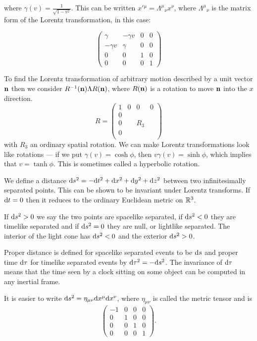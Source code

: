 \documentclass{notes}
\begin{document}
where $\gamma(v) = \frac{1}{\sqrt{1-v^2}}$.  This can be written
$x'{}^\mu = \Lambda^\mu{}_\nu x^\nu$, where $\Lambda^\mu{}_\nu$ is the
matrix form of the Lorentz transformation, in this case:

\[
\begin{pmatrix}
\gamma & - \gamma v & 0 & 0 \\
- \gamma v & \gamma & 0 & 0 \\
0 & 0 & 1 & 0 \\
0 & 0 & 0 & 1
\end{pmatrix}
\]

To find the Lorentz transformation of arbitrary motion described by
a unit vector $\mathbf{n}$ then we consider
$R^{-1}(\mathbf{n}) \Lambda R(\mathbf{n})$, where $R(\mathbf{n})$ is a rotation
to move $\mathbf{n}$ into the $x$ direction.
\[
R = \begin{pmatrix}
1 & 0 & 0 & 0 \\
0 &   &   &   \\
0 &   & R_3 & \\
0 &   &   &   \\
\end{pmatrix}
\]
with $R_3$ an ordinary spatial rotation.  We can make Lorentz
transformations look like rotations --- if we put $\gamma(v) = \cosh \phi$,
then $v \gamma(v) = \sinh \phi$, which implies that $v = \tanh \phi$.  This
is sometimes called a hyperbolic rotation.

We define a distance $\mathrm{d} s^2 = -\mathrm{d} t^2 + \mathrm{d} x^2 + \mathrm{d} y^2 + \mathrm{d} z^2$
between two
infinitesimally separated points.  This can be shown to be invariant under
Lorentz transforms.  If $\mathrm{d} t = 0$ then it reduces to the ordinary Euclidean
metric on $\mathbb{R}^3$.

If $\mathrm{d} s^2 > 0$ we say the two points are spacelike separated, if $\mathrm{d} s^2 < 0$
they are timelike separated and if $\mathrm{d} s^2 = 0$ they are null, or lightlike
separated.  The interior of the light cone has $\mathrm{d} s^2 < 0$ and the exterior
$\mathrm{d} s^2 > 0$.

Proper distance is defined for spacelike separated events to be $\mathrm{d} s$
and proper time $\mathrm{d}\tau$ for timelike separated events by $\mathrm{d}\tau^2
= -\mathrm{d} s^2$.
The invariance of $\mathrm{d}\tau$ means that the time seen by a clock sitting on
some object can be computed in any inertial frame.

It is easier to write $\mathrm{d} s^2 = \eta_{\mu \nu} \mathrm{d} x^\mu \mathrm{d} x^\nu$, where
$\eta_{\mu \nu}$ is called the metric tensor and is
\[
\begin{pmatrix}
-1 & 0 & 0 & 0 \\
0  & 1 & 0 & 0 \\
0  & 0 & 1 & 0 \\
0  & 0 & 0 & 1
\end{pmatrix}.
\]
\end{document}
